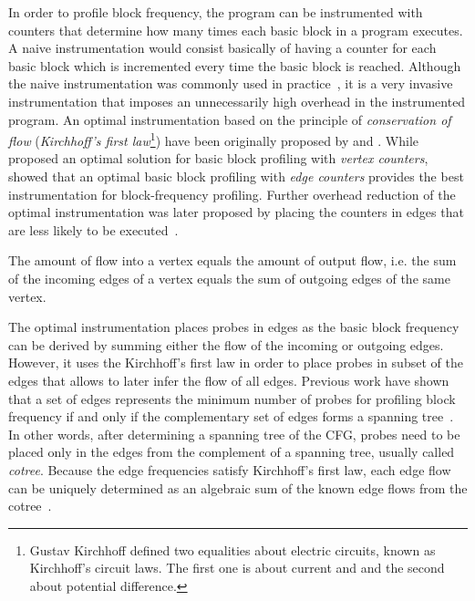 In order to profile  block frequency, the program can be instrumented with counters that determine how many times each basic block in a program executes.
A naive instrumentation would consist basically of having a counter for each basic block which is incremented every time the basic block is reached.
Although the naive instrumentation was commonly used in practice~\citep{knuth71}, it is a very invasive instrumentation that imposes an unnecessarily high overhead in the instrumented program.
An optimal instrumentation based on the principle of \textit{conservation of flow} (\textit{Kirchhoff's first law}\footnote{Gustav Kirchhoff defined two equalities about electric circuits, known as Kirchhoff's circuit laws. The first one is about current and and the second about potential difference.}) have been originally proposed by \cite{nahapetian73} and \cite{knuth73}.
While \cite{knuth73} proposed an optimal solution for basic block profiling with \textit{vertex counters}, \cite{ball94} showed that an optimal basic block profiling with \textit{edge counters} provides the best instrumentation for block-frequency profiling.
Further overhead reduction of the optimal instrumentation was later proposed by placing the counters in edges that are less likely to be executed~\cite{forman81,ball94}.

\begin{definition}
The amount of flow into a vertex equals the amount of output flow, i.e. the sum of the incoming edges of a vertex equals the sum of outgoing edges of the same vertex.
\end{definition}

The optimal instrumentation places probes in edges as the basic block frequency can be derived by summing either the flow of the incoming or outgoing edges.
However, it uses the Kirchhoff's first law in order to place probes in subset of the edges that allows to later infer the flow of all edges.
Previous work have shown that a set of edges represents the minimum number of probes for profiling block frequency if and only if the complementary set of edges forms a spanning tree~\citep{nahapetian73,ball94}.
In other words, after determining a spanning tree of the CFG, probes need to be placed only in the edges from the complement of a spanning tree, usually called \textit{cotree}.
Because the edge frequencies satisfy Kirchhoff's first law, each edge flow can be uniquely determined as an algebraic sum of the known edge flows from the cotree~\citep{nahapetian73,ball94}.

